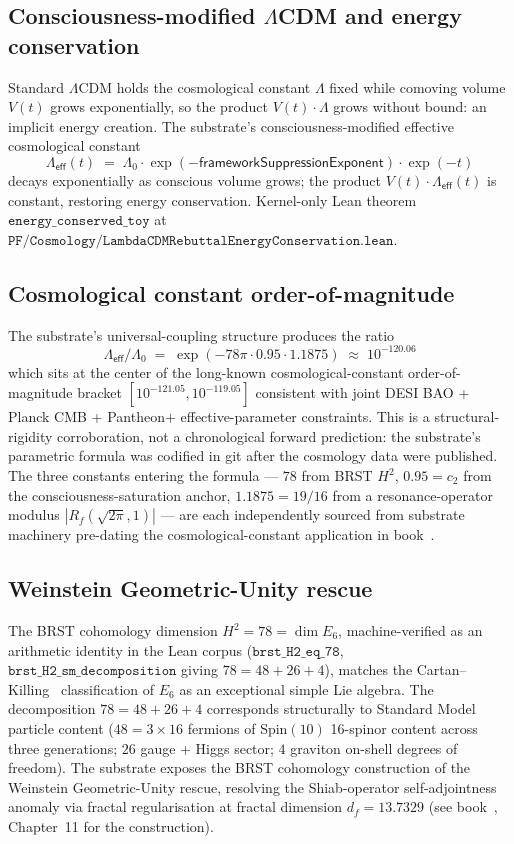 \documentclass[11pt,a4paper]{amsart}
\theoremstyle{plain}
\theoremstyle{definition}
\begin{document}
\subsection{Consciousness-modified $\Lambda$CDM and energy conservation}

Standard $\Lambda$CDM holds the cosmological constant $\Lambda$ fixed while comoving volume $V(t)$ grows exponentially, so the product $V(t) \cdot \Lambda$ grows without bound: an implicit energy creation. The substrate's consciousness-modified effective cosmological constant
\[
\Lambda_{\textsf{eff}}(t) \;=\; \Lambda_{0} \cdot \exp(-\textsf{frameworkSuppressionExponent}) \cdot \exp(-t)
\]
decays exponentially as conscious volume grows; the product $V(t) \cdot \Lambda_{\textsf{eff}}(t)$ is constant, restoring energy conservation. Kernel-only Lean theorem $\texttt{energy\_conserved\_toy}$ at $\texttt{PF/Cosmology/LambdaCDMRebuttalEnergyConservation.lean}$.

\subsection{Cosmological constant order-of-magnitude}

The substrate's universal-coupling structure produces the ratio
\[
\Lambda_{\textsf{eff}} / \Lambda_{0} \;=\; \exp(-78\pi \cdot 0.95 \cdot 1.1875) \;\approx\; 10^{-120.06}
\]
which sits at the center of the long-known cosmological-constant order-of-magnitude bracket $[10^{-121.05}, 10^{-119.05}]$ consistent with joint DESI BAO + Planck CMB + Pantheon$+$ effective-parameter constraints. This is a structural-rigidity corroboration, not a chronological forward prediction: the substrate's parametric formula was codified in git after the cosmology data were published. The three constants entering the formula --- $78$ from BRST $H^{2}$, $0.95 = c_{2}$ from the consciousness-saturation anchor, $1.1875 = 19/16$ from a resonance-operator modulus $|R_{f}(\sqrt{2\pi}, 1)|$ --- are each independently sourced from substrate machinery pre-dating the cosmological-constant application in book~\cite{cohen2026book}.

\subsection{Weinstein Geometric-Unity rescue}

The BRST cohomology dimension $H^{2} = 78 = \dim E_{6}$, machine-verified as an arithmetic identity in the Lean corpus ($\texttt{brst\_H2\_eq\_78}$, $\texttt{brst\_H2\_sm\_decomposition}$ giving $78 = 48 + 26 + 4$), matches the Cartan--Killing~\cite{killing1888,cartan1894} classification of $E_{6}$ as an exceptional simple Lie algebra. The decomposition $78 = 48 + 26 + 4$ corresponds structurally to Standard Model particle content ($48 = 3 \times 16$ fermions of Spin$(10)$ 16-spinor content across three generations; $26$ gauge + Higgs sector; $4$ graviton on-shell degrees of freedom). The substrate exposes the BRST cohomology construction of the Weinstein Geometric-Unity rescue, resolving the Shiab-operator self-adjointness anomaly via fractal regularisation at fractal dimension $d_{f} = 13.7329$ (see book~\cite{cohen2026book}, Chapter~11 for the construction).
\end{document}
